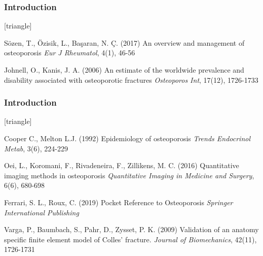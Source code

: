 \documentclass[xcolor=table,11pt]{beamer}
\begin{document}
	\begin{frame}
		\frametitle{Introduction}
		\footnotesize{
				\begin{thebibliography}{99}
						[triangle]
						
						 Sözen, T., Özisik, L., Başaran, N. Ç. (2017)
						\newblock An overview and management of osteoporosis
						\newblock \textit{Eur J Rheumatol}, 4(1), 46-56

						Johnell, O., Kanis, J. A. (2006)
						\newblock An estimate of the worldwide prevalence and disability associated with osteoporotic fractures
						\newblock \textit{Osteoporos Int}, 17(12), 1726-1733
						
					\end{thebibliography}
			}
	\end{frame}

	\begin{frame}
		\frametitle{Introduction}
		\footnotesize{
				\begin{thebibliography}{99}
						\setbeamertemplate{bibliography item}[triangle]
						
						 Cooper C., Melton L.J. (1992)
						\newblock Epidemiology of osteoporosis
						\newblock \textit{Trends Endocrinol Metab}, 3(6), 224-229
						
						 Oei, L., Koromani, F., Rivadeneira, F., Zillikens, M. C. (2016)
						\newblock Quantitative imaging methods in osteoporosis
						\newblock \textit{Quantitative Imaging in Medicine and Surgery}, 6(6), 680-698
						
						  Ferrari, S. L., Roux, C. (2019)
						\newblock Pocket Reference to Osteoporosis
						\newblock \textit{Springer International Publishing}

						  Varga, P., Baumbach, S., Pahr, D., Zysset, P. K. (2009)
						\newblock Validation of an anatomy specific finite element model of Colles' fracture.
						\newblock \textit{Journal of Biomechanics}, 42(11), 1726-1731
						
					\end{thebibliography}
			}
	\end{frame}
\end{document}
